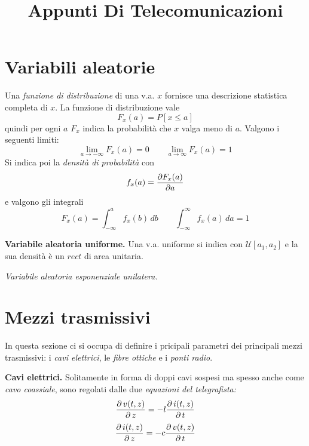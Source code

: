 \documentclass[a4paper,portrait,12pt]{article}
\theoremstyle{definition}
\begin{document}
\title{Appunti Di Telecomunicazioni}

\maketitle
\date
\newpage

\tableofcontents
\newpage

\section{Variabili aleatorie}

Una \textit{funzione di distribuzione} di una v.a. $x$ fornisce una descrizione statistica completa di $x$. La 
funzione di distribuzione vale
\begin{equation}
F_x(a) = P[x \le a]
\end{equation}
quindi per ogni $a$ $F_x$ indica la probabilità che $x$ valga meno di $a$. Valgono i seguenti limiti:
\begin{equation}
\lim_{a \to -\infty} F_x(a) = 0 \qquad \lim_{a \to \infty} F_x(a) = 1
\end{equation}
Si indica poi la \textit{densità di probabilità} con 
\begin{equation}
f_x(a) = {\partial F_x(a)\over \partial a}
\end{equation}
e valgono gli integrali
\begin{equation}
F_x(a) = \int_{-\infty}^a f_x(b)\,db \qquad \int_{-\infty}^{\infty} f_x(a)\,da = 1
\end{equation}
\bigskip

\textbf{Variabile aleatoria uniforme.} Una v.a. uniforme si indica con $\mathcal{U}[a_1,a_2]$ e la sua 
densità è un $rect$ di area unitaria.
\bigskip

\textit{Variabile aleatoria esponenziale unilatera.}
\bigskip


\section{Mezzi trasmissivi}

In questa sezione ci si occupa di definire i pricipali parametri dei principali mezzi trasmissivi: 
i \textit{cavi elettrici}, le \textit{fibre ottiche} e i \textit{ponti radio}.
\bigskip

\textbf{Cavi elettrici.} Solitamente in forma di doppi cavi sospesi ma spesso anche come \textit{cavo 
coassiale}, sono regolati dalle due \textit{equazioni del telegrafista:}
\begin{equation}
\label{eqn:telegraf1}
{\partial\,v(t,z) \over \partial\,z} = -l {\partial\,i(t,z) \over \partial\,t}
\end{equation}
\begin{equation}
\label{eqn:telegraf2}
{\partial\,i(t,z) \over \partial\,z} = -c {\partial\,v(t,z) \over \partial\,t}
\end{equation}
\end{document}
